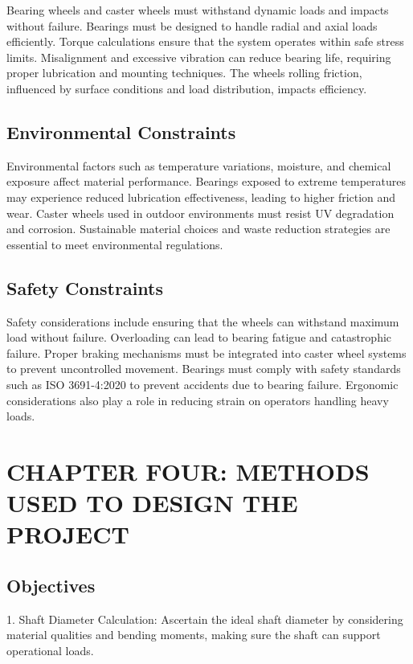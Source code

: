 \documentclass[../../main]{subfiles}
\begin{document}
Bearing wheels and caster wheels must withstand dynamic loads and
impacts without failure. Bearings must be designed to handle radial and
axial loads efficiently. Torque calculations ensure that the system
operates within safe stress limits. Misalignment and excessive vibration
can reduce bearing life, requiring proper lubrication and mounting
techniques. The wheel\textquotesingle s rolling friction, influenced by
surface conditions and load distribution, impacts efficiency.

\subsection{Environmental Constraints}

Environmental factors such as temperature variations, moisture, and
chemical exposure affect material performance. Bearings exposed to
extreme temperatures may experience reduced lubrication effectiveness,
leading to higher friction and wear. Caster wheels used in outdoor
environments must resist UV degradation and corrosion. Sustainable
material choices and waste reduction strategies are essential to meet
environmental regulations.

\subsection{Safety Constraints}

Safety considerations include ensuring that the wheels can withstand
maximum load without failure. Overloading can lead to bearing fatigue
and catastrophic failure. Proper braking mechanisms must be integrated
into caster wheel systems to prevent uncontrolled movement. Bearings
must comply with safety standards such as ISO 3691-4:2020 to prevent
accidents due to bearing failure. Ergonomic considerations also play a
role in reducing strain on operators handling heavy loads.

\section{CHAPTER FOUR: METHODS USED TO DESIGN THE PROJECT}

\subsection{Objectives}

1. Shaft Diameter Calculation: Ascertain the ideal shaft diameter by
considering material qualities and bending moments, making sure the
shaft can support operational loads.
\end{document}
